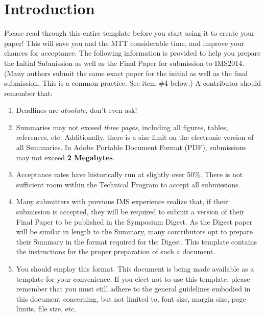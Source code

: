 \documentclass[conference]{IEEEtran}
\begin{document}
\section{Introduction}
Please read through this entire template before you start using it to create your paper! This will save you and the MTT considerable time, and improve your chances for acceptance. The following information is provided to help you prepare the Initial Submission as well as the Final Paper for submission to IMS2014. (Many authors submit the same exact paper for the initial as well as the final submission. This is a common practice. See item \#4 below.) A contributor should remember that:
\begin{enumerate} 
 \setlength{\itemsep}{-2ex}  
 \setlength{\parskip}{0ex} 
 \setlength{\parsep}{0ex}
\item Deadlines are {\itshape absolute}, don't even ask!\hfil\break
\item Summaries may not exceed {\itshape three pages}, including all figures, tables, references, etc. Additionally, there is a size limit on the electronic version of all Summaries. In Adobe Portable Document Format (PDF), submissions may not exceed {\bfseries 2 Megabytes}.\hfil\break
\item Acceptance rates have historically run at slightly over 50\%. There is not sufficient room within the Technical Program to accept all submissions.\hfil\break
\item Many submitters with previous IMS experience realize that, if their submission is accepted, they will be required to submit a version of their Final Paper to be published in the Symposium Digest. As the Digest paper will be similar in length to the Summary, many contributors opt to prepare their Summary in the format required for the Digest. This template contains the instructions for the proper preparation of such a document.\hfil\break
\item You should employ this format. This document is being made available as a template for your convenience. If you elect not to use this template, please remember that you must still adhere to the general guidelines embodied in this document concerning, but not limited to, font size, margin size, page limits, file size, etc.  
\end{enumerate}
\end{document}
